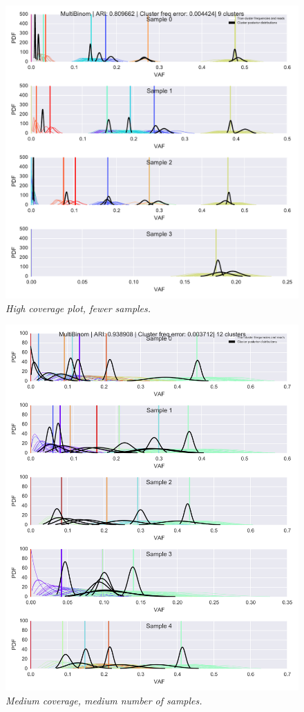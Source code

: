 \documentclass[11pt]{article}
\begin{document}
\begin{appendices}
\begin{figure}[H]
\centerline{\includegraphics[scale=0.85]{high_coverage_indiv_plot.pdf}}
\caption{\emph{High coverage plot, fewer samples.}}
\end{figure}

\begin{figure}[H]
\centerline{\includegraphics[scale=0.85]{med_coverage_med_samples_indiv_plot.png}}
\caption{\emph{Medium coverage, medium number of samples.}}
\end{figure}


\end{appendices}
\end{document}
